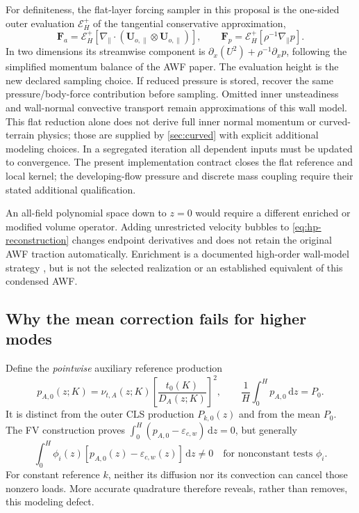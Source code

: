 \documentclass[11pt,a4paper]{article}
\numberwithin{equation}{section}
\newcommand{\dd}{\mathrm{d}}
\newcommand{\eps}{\varepsilon}
\newcommand{\ECw}{\eps_{c,w}}
\begin{document}
For definiteness, the flat-layer forcing sampler in this proposal is
the one-sided outer evaluation $\mathcal E_H^+$ of the tangential
conservative approximation,
\begin{equation}
 \bm F_a=\mathcal E_H^+[
  \nabla_\parallel\cdot(\bm U_{o,\parallel}\otimes\bm U_{o,\parallel})],
 \qquad
 \bm F_p=\mathcal E_H^+[\rho^{-1}\nabla_\parallel p].
 \label{eq:hp-forcing-sampler}
\end{equation}
In two dimensions its streamwise component is
$\partial_x(U^2)+\rho^{-1}\partial_xp$, following the simplified
momentum balance of the AWF paper. The evaluation height is the new
declared sampling choice. If reduced pressure is stored, recover the
same pressure/body-force contribution before sampling. Omitted inner
unsteadiness and wall-normal convective transport remain approximations
of this wall model. This flat reduction alone does not derive full inner
normal momentum or curved-terrain physics; those are supplied by
\cref{sec:curved} with explicit additional modeling choices. In a segregated iteration
all dependent inputs must be updated to convergence. The present
implementation contract closes the flat reference and local kernel;
the developing-flow pressure and discrete mass coupling require their
stated additional qualification.

An all-field polynomial space down to $z=0$ would require a different
enriched or modified volume operator. Adding unrestricted velocity
bubbles to \cref{eq:hp-reconstruction} changes endpoint derivatives and
does not retain the original AWF traction automatically. Enrichment
is a documented high-order wall-model strategy \cite{Brill2024}, but
is not the selected realization or an established equivalent of this
condensed AWF.

\subsection{Why the mean correction fails for higher modes}
\label{sec:hp-source}
Define the \emph{pointwise} auxiliary reference production
\begin{equation}
 \boxed{p_{A,0}(z;K)
 =\nu_{t,A}(z;K)\left[\frac{t_0(K)}{D_A(z;K)}\right]^2,
 \qquad\frac1H\int_0^H p_{A,0}\,\dd z=P_0.}
 \label{eq:pA0}
\end{equation}
It is distinct from the outer CLS production $P_{k,0}(z)$ and from the
mean $P_0$. The FV construction proves
$\int_0^H(p_{A,0}-\ECw)\,\dd z=0$, but generally
\begin{equation}
 \int_0^H\phi_i(z)[p_{A,0}(z)-\ECw(z)]\,\dd z\ne0
 \quad\text{for nonconstant tests }\phi_i.
 \label{eq:hp-mean-insufficient}
\end{equation}
For constant reference $k$, neither its diffusion nor its convection
can cancel those nonzero loads. More accurate quadrature therefore
reveals, rather than removes, this modeling defect.
\end{document}
